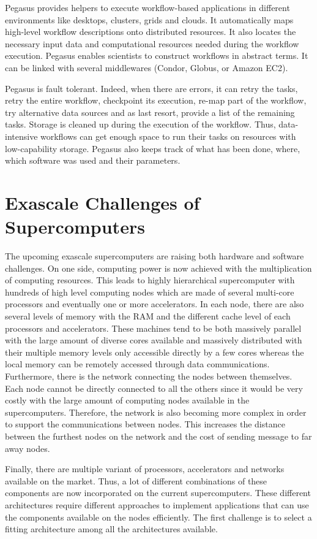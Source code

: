 Pegasus provides helpers to execute workflow-based applications in different environments like desktops, clusters, grids and clouds.
It automatically maps high-level workflow descriptions onto distributed resources.
It also locates the necessary input data and computational resources needed during the workflow execution.
Pegasus enables scientists to construct workflows in abstract terms.
It can be linked with several middlewares (Condor, Globus, or Amazon EC2).

Pegasus is fault tolerant.
Indeed, when there are errors, it can retry the tasks, retry the entire workflow, checkpoint its execution, re-map part of the workflow, try alternative data sources and as last resort, provide a list of the remaining tasks.
Storage is cleaned up during the execution of the workflow.
Thus, data-intensive workflows can get enough space to run their tasks on resources with low-capability storage.
Pegasus also keeps track of what has been done, where, which software was used and their parameters.


\section{Exascale Challenges of Supercomputers}
The upcoming exascale supercomputers are raising both hardware and software challenges.
On one side, computing power is now achieved with the multiplication of computing resources.
This leads to highly hierarchical supercomputer with hundreds of high level computing nodes which are made of several multi-core processors and eventually one or more accelerators.
In each node, there are also several levels of memory with the RAM and the different cache level of each processors and accelerators.
These machines tend to be both massively parallel with the large amount of diverse cores available and massively distributed with their multiple memory levels only accessible directly by a few cores whereas the local memory can be remotely accessed through data communications.
Furthermore, there is the network connecting the nodes between themselves.
Each node cannot be directly connected to all the others since it would be very costly with the large amount of computing nodes available in the supercomputers.
Therefore, the network is also becoming more complex in order to support the communications between nodes.
This increases the distance between the furthest nodes on the network and the cost of sending message to far away nodes.

Finally, there are multiple variant of processors, accelerators and networks available on the market.
Thus, a lot of different combinations of these components are now incorporated on the current supercomputers.
These different architectures require different approaches to implement applications that can use the components available on the nodes efficiently.
The first challenge is to select a fitting architecture among all the architectures available.


